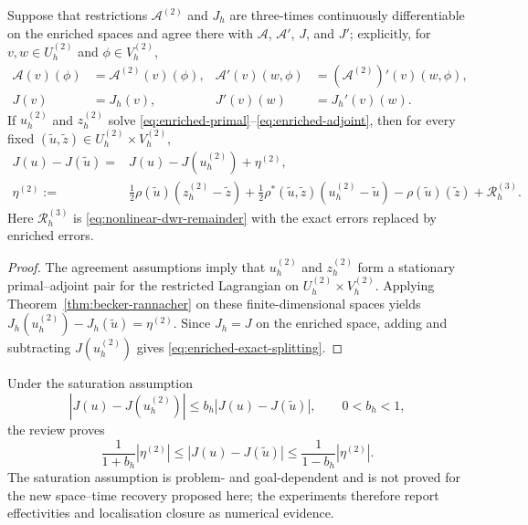 \begin{theorem}
\label{thm:enriched-space-dwr}
Suppose that restrictions \(\mathcal A^{(2)}\) and \(J_h\) are three-times continuously differentiable on the enriched spaces and agree there with \(\mathcal A\), \(\mathcal A'\), \(J\), and \(J'\); explicitly, for \(v,w\in U_h^{(2)}\) and \(\phi\in V_h^{(2)}\),
\begin{align*}
 \mathcal A(v)(\phi)
 &=\mathcal A^{(2)}(v)(\phi),
 &
 \mathcal A'(v)(w,\phi)
 &=(\mathcal A^{(2)})'(v)(w,\phi),
 \label{eq:enriched-operator-agreement}\\
 J(v)&=J_h(v),
 &
 J'(v)(w)&=J_h'(v)(w).
 \label{eq:enriched-goal-agreement}
\end{align*}
If \(u_h^{(2)}\) and \(z_h^{(2)}\) solve \eqref{eq:enriched-primal}--\eqref{eq:enriched-adjoint}, then for every fixed \((\widetilde u,\widetilde z)\in U_h^{(2)}\times V_h^{(2)}\),
\begin{align}
 J(u)-J(\widetilde u)
 ={}&J(u)-J(u_h^{(2)})+\eta^{(2)},
 \label{eq:enriched-exact-splitting}\\
 \eta^{(2)}
 :={}&\tfrac12\rho(\widetilde u)(z_h^{(2)}-\widetilde z)
 +\tfrac12\rho^\ast(\widetilde u,\widetilde z)
  (u_h^{(2)}-\widetilde u)-\rho(\widetilde u)(\widetilde z)+\mathcal R_h^{(3)}.
 \label{eq:enriched-nonlinear-dwr}
\end{align}
Here \(\mathcal R_h^{(3)}\) is \eqref{eq:nonlinear-dwr-remainder} with the exact errors replaced by enriched errors.
\end{theorem}

\begin{proof}
The agreement assumptions imply that \(u_h^{(2)}\) and \(z_h^{(2)}\) form a stationary primal--adjoint pair for the restricted Lagrangian on \(U_h^{(2)}\times V_h^{(2)}\). Applying Theorem~\ref{thm:becker-rannacher} on these finite-dimensional spaces yields \(J_h(u_h^{(2)})-J_h(\widetilde u)=\eta^{(2)}\). Since \(J_h=J\) on the enriched space, adding and subtracting \(J(u_h^{(2)})\) gives \eqref{eq:enriched-exact-splitting}.
\end{proof}

Under the saturation assumption
\begin{equation}
 |J(u)-J(u_h^{(2)})|
 \le b_h|J(u)-J(\widetilde u)|,
 \qquad 0<b_h<1,
 \label{eq:goal-saturation}
\end{equation}
the review \cite{ENDTMAYER202419} proves
\begin{equation}
 \frac{1}{1+b_h}|\eta^{(2)}|
 \le |J(u)-J(\widetilde u)|
 \le \frac{1}{1-b_h}|\eta^{(2)}|.
 \label{eq:enriched-reliability-efficiency}
\end{equation}
The saturation assumption is problem- and goal-dependent and is not proved for the new space--time recovery proposed here; the experiments therefore report effectivities and localisation closure as numerical evidence.

